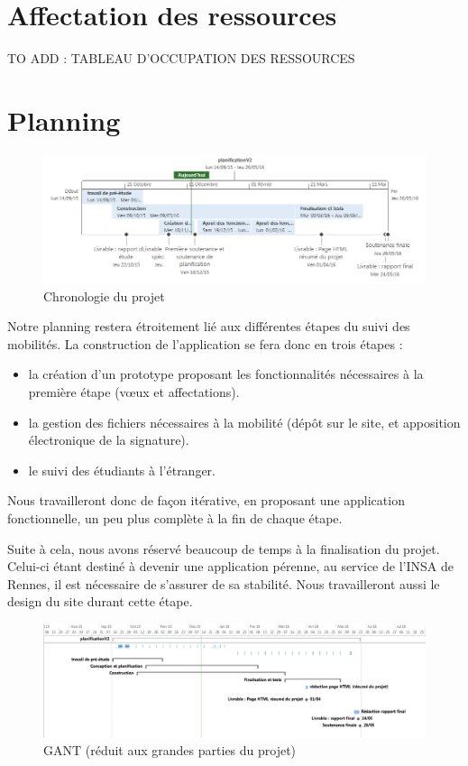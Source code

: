 \section{Affectation des ressources}
TO ADD : TABLEAU D'OCCUPATION DES RESSOURCES


\section{Planning}
\begin{figure}[H]
	\centering
	\includegraphics[scale=0.7]{images/chrono_planif.png}
	\caption{Chronologie du projet}
	\label{fig::chrono}
\end{figure}

Notre planning restera étroitement lié aux différentes étapes du suivi des mobilités. La construction de l'application se fera donc en trois étapes :
\begin{itemize}
 \item la création d'un prototype proposant les fonctionnalités nécessaires à la première étape (vœux et affectations).
 \item la gestion des fichiers nécessaires à la mobilité (dépôt sur le site, et apposition électronique de la signature).
 \item le suivi des étudiants à l'étranger.
\end{itemize}
Nous travailleront donc de façon itérative, en proposant une application fonctionnelle, un peu plus complète à la fin de chaque étape.


Suite à cela, nous avons réservé beaucoup de temps à la finalisation du projet. Celui-ci étant destiné à devenir une application pérenne, au service de l'INSA de Rennes, il est nécessaire de s'assurer de sa stabilité. Nous travailleront aussi le design du site durant cette étape. 

\begin{figure}[H]
	\centering
	\includegraphics[scale=0.5]{images/gant.PNG}
	\caption{GANT (réduit aux grandes parties du projet)}
\end{figure}


